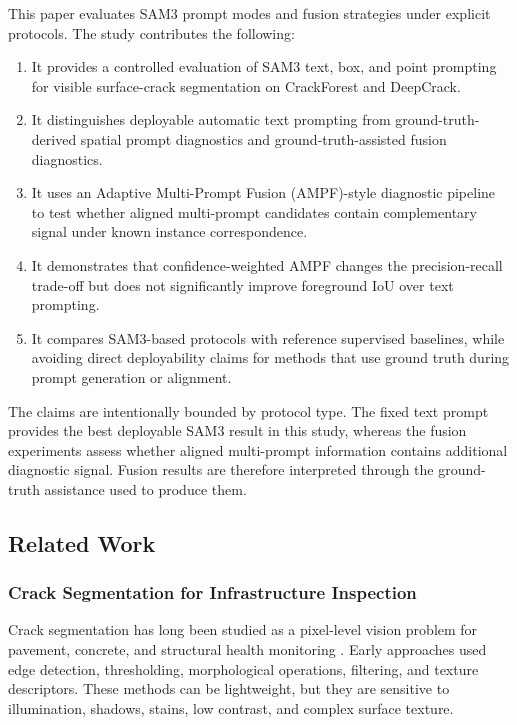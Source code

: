 \documentclass[applsci,article,submit,pdftex,moreauthors]{Definitions/mdpi}
\begin{document}
This paper evaluates SAM3 prompt modes and fusion strategies under
explicit protocols. The study contributes the following:

\begin{enumerate}
\def\labelenumi{\arabic{enumi}.}
\item
  It provides a controlled evaluation of SAM3 text, box, and point
  prompting for visible surface-crack segmentation on CrackForest and
  DeepCrack.
\item
  It distinguishes deployable automatic text prompting from
  ground-truth-derived spatial prompt diagnostics and
  ground-truth-assisted fusion diagnostics.
\item
  It uses an Adaptive Multi-Prompt Fusion (AMPF)-style diagnostic
  pipeline to test whether aligned multi-prompt candidates contain
  complementary signal under known instance correspondence.
\item
  It demonstrates that confidence-weighted AMPF changes the
  precision-recall trade-off but does not significantly improve
  foreground IoU over text prompting.
\item
  It compares SAM3-based protocols with reference supervised baselines,
  while avoiding direct deployability claims for methods that use ground
  truth during prompt generation or alignment.
\end{enumerate}

The claims are intentionally bounded by protocol type. The fixed text
prompt provides the best deployable SAM3 result in this study, whereas
the fusion experiments assess whether aligned multi-prompt information
contains additional diagnostic signal. Fusion results are therefore
interpreted through the ground-truth assistance used to produce them.

\subsection{Related Work}

\subsubsection{Crack Segmentation for Infrastructure Inspection}

Crack segmentation has long been studied as a pixel-level vision problem
for pavement, concrete, and structural health monitoring
\cite{koch2015,sony2019,shi2016,liu2019,yang2020,zhang2017,cha2017,mei2020,gong2023,yuan2024,yang2018}. Early approaches used edge detection, thresholding,
morphological operations, filtering, and texture descriptors. These
methods can be lightweight, but they are sensitive to illumination,
shadows, stains, low contrast, and complex surface texture.
\end{document}
